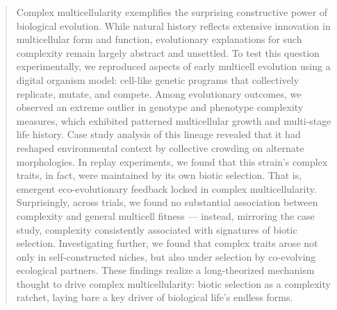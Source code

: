 \begin{abstract}
Complex multicellularity exemplifies the surprising constructive power of biological evolution.
While natural history reflects extensive innovation in multicellular form and function, evolutionary explanations for such complexity remain largely abstract and unsettled.
To test this question experimentally, we reproduced aspects of early multicell evolution using a digital organism model: cell-like genetic programs that collectively replicate, mutate, and compete.
Among evolutionary outcomes, we observed an extreme outlier in genotype and phenotype complexity measures, which exhibited patterned multicellular growth and multi-stage life history.
Case study analysis of this lineage revealed that it had reshaped environmental context by collective crowding on alternate morphologies.
In replay experiments, we found that this strain's complex traits, in fact, were maintained by its own biotic selection.
That is, emergent eco-evolutionary feedback locked in complex multicellularity.
Surprisingly, across trials, we found no substantial association between complexity and general multicell fitness --- instead, mirroring the case study, complexity consistently associated with signatures of biotic selection.
Investigating further, we found that complex traits arose not only in self-constructed niches, but also under selection by co-evolving ecological partners.
These findings realize a long-theorized mechanism thought to drive complex multicellularity: biotic selection as a complexity ratchet, laying bare a key driver of biological life's endless forms.
\end{abstract}
